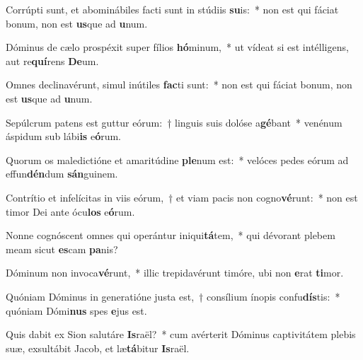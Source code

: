 \item Corrúpti sunt, et abominábiles facti sunt in stúdiis \textbf{su}is:~* non est qui fáciat bonum, non est \textbf{us}que ad \textbf{u}num.
\item Dóminus de cælo prospéxit super fílios \textbf{hó}minum,~* ut vídeat si est intélligens, aut re\textbf{quí}rens \textbf{De}um.
\item Omnes declinavérunt, simul inútiles \textbf{fac}ti sunt:~* non est qui fáciat bonum, non est \textbf{us}que ad \textbf{u}num.
\item Sepúlcrum patens est guttur eórum:~† linguis suis dolóse a\textbf{gé}bant~* venénum áspidum sub lábi\textbf{is} e\textbf{ó}rum.
\item Quorum os maledictióne et amaritúdine \textbf{ple}num est:~* velóces pedes eórum ad effun\textbf{dén}dum \textbf{sán}guinem.
\item Contrítio et infelícitas in viis eórum,~† et viam pacis non cogno\textbf{vé}runt:~* non est timor Dei ante ócu\textbf{los} e\textbf{ó}rum.
\item Nonne cognóscent omnes qui operántur iniqui\textbf{tá}tem,~* qui dévorant plebem meam sicut \textbf{es}cam \textbf{pa}nis?
\item Dóminum non invoca\textbf{vé}runt,~* illic trepidavérunt timóre, ubi non \textbf{e}rat \textbf{ti}mor.
\item Quóniam Dóminus in generatióne justa est,~† consílium ínopis confu\textbf{dís}tis:~* quóniam Dómi\textbf{nus} spes \textbf{e}jus est.
\item Quis dabit ex Sion salutáre \textbf{Is}raël?~* cum avérterit Dóminus captivitátem plebis suæ, exsultábit Jacob, et læ\textbf{tá}bitur \textbf{Is}raël.
